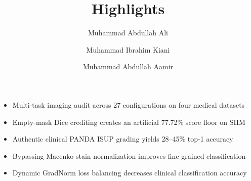 \documentclass[preprint,12pt]{elsarticle}
\begin{document}
\begin{frontmatter}

\title{Highlights}

\author[fast]{Muhammad Abdullah Ali}
\author[fast]{Muhammad Ibrahim Kiani}
\author[fast]{Muhammad Abdullah Aamir}


\end{frontmatter}

\begin{itemize}
    \item Multi-task imaging audit across 27 configurations on four medical datasets
    \item Empty-mask Dice crediting creates an artificial 77.72\% score floor on SIIM
    \item Authentic clinical PANDA ISUP grading yields 28--45\% top-1 accuracy
    \item Bypassing Macenko stain normalization improves fine-grained classification
    \item Dynamic GradNorm loss balancing decreases clinical classification accuracy
\end{itemize}
\end{document}
